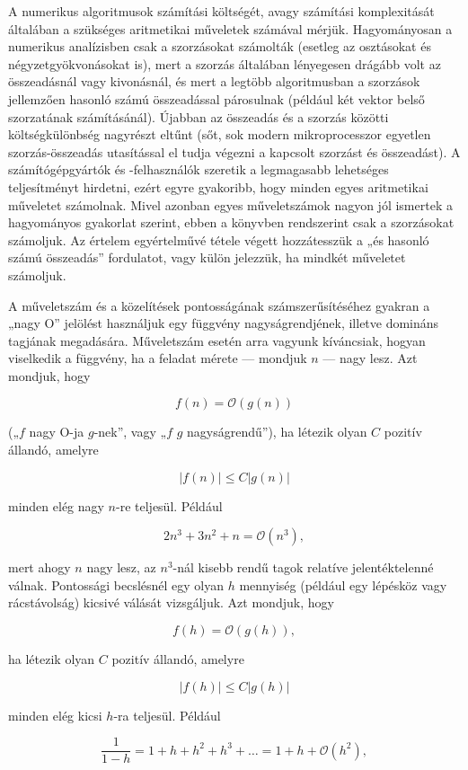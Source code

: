 \documentclass[
  magyar,
  11pt]{article}
\begin{document}
A numerikus algoritmusok számítási költségét, avagy számítási
komplexitását általában a szükséges aritmetikai műveletek számával
mérjük. Hagyományosan a numerikus analízisben csak a szorzásokat
számolták (esetleg az osztásokat és négyzetgyökvonásokat is), mert a
szorzás általában lényegesen drágább volt az összeadásnál vagy
kivonásnál, és mert a legtöbb algoritmusban a szorzások jellemzően
hasonló számú összeadással párosulnak (például két vektor belső
szorzatának számításánál). Újabban az összeadás és a szorzás közötti
költségkülönbség nagyrészt eltűnt (sőt, sok modern mikroprocesszor
egyetlen szorzás-összeadás utasítással el tudja végezni a kapcsolt
szorzást és összeadást). A számítógépgyártók és -felhasználók szeretik a
legmagasabb lehetséges teljesítményt hirdetni, ezért egyre gyakoribb,
hogy minden egyes aritmetikai műveletet számolnak. Mivel azonban egyes
műveletszámok nagyon jól ismertek a hagyományos gyakorlat szerint, ebben
a könyvben rendszerint csak a szorzásokat számoljuk. Az értelem
egyértelművé tétele végett hozzátesszük a „és hasonló számú összeadás''
fordulatot, vagy külön jelezzük, ha mindkét műveletet számoljuk.

A műveletszám és a közelítések pontosságának számszerűsítéséhez gyakran
a „nagy O'' jelölést használjuk egy függvény nagyságrendjének, illetve
domináns tagjának megadására. Műveletszám esetén arra vagyunk
kíváncsiak, hogyan viselkedik a függvény, ha a feladat mérete ---
mondjuk \(n\) --- nagy lesz. Azt mondjuk, hogy

\[f(n) = \mathcal{O}(g(n))\]

(„\(f\) nagy O-ja \(g\)-nek'', vagy „\(f\) \(g\) nagyságrendű''), ha
létezik olyan \(C\) pozitív állandó, amelyre

\[|f(n)| \le C|g(n)|\]

minden elég nagy \(n\)-re teljesül. Például

\[2n^3 + 3n^2 + n = \mathcal{O}(n^3),\]

mert ahogy \(n\) nagy lesz, az \(n^3\)-nál kisebb rendű tagok relatíve
jelentéktelenné válnak. Pontossági becslésnél egy olyan \(h\) mennyiség
(például egy lépésköz vagy rácstávolság) kicsivé válását vizsgáljuk. Azt
mondjuk, hogy

\[f(h) = \mathcal{O}(g(h)),\]

ha létezik olyan \(C\) pozitív állandó, amelyre

\[|f(h)| \leq C|g(h)|\]

minden elég kicsi \(h\)-ra teljesül. Például

\[\frac{1}{1-h} = 1 + h + h^2 + h^3 + \dots = 1 + h + \mathcal{O}(h^2),\]
\end{document}
